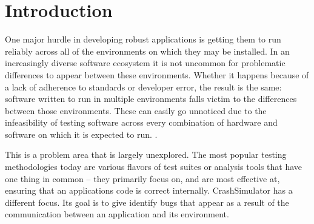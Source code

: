 \section{Introduction}


One major hurdle in developing robust applications is getting them to run reliably across all of the environments on
which they may be installed.  In an increasingly diverse software ecosystem it is not uncommon for problematic
differences to appear between these environments.  Whether it happens because of a lack of adherence to standards or
developer error, the result is the same: software written to run in multiple environments falls victim to the
differences between those environments.  These can easily go unnoticed due to the infeasibility of testing software
across every combination of hardware and software on which it is
expected to run. .

This is a problem area that is largely unexplored.  The most popular
testing methodologies today are various flavors of test suites or
analysis tools that have one thing in common  -- they primarily focus on, and
are most effective at, ensuring that an applications code is correct
internally. CrashSimulator has a
different focus.  Its goal is to give identify bugs that appear as a
result of the communication between an application and its
environment.

